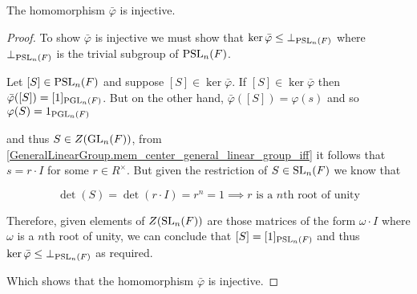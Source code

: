 \begin{lemma}
\label{Injective_PSL_monoidHom_PGL}
\leanok
    The homomorphism $\bar{\varphi}$ is injective.
\end{lemma}
\begin{proof}
\leanok

To show $\bar{\varphi}$ is injective we must show that $\ker \bar{\varphi} \leq \bot_{\operatorname{PSL}_n(F)}$ where $\bot_{\operatorname{PSL}_n(F)}$ is the trivial subgroup of $\operatorname{PSL}_n(F)$.

Let $[S] \in \operatorname{PSL}_n(F)$ and suppose $[S] \in \ker \bar{\varphi}$. If $[S] \in \ker \bar{\varphi}$ then $\bar{\varphi} ([S]) = [1]_{\operatorname{PGL}_n(F)}$. But on the other hand, $\bar{\varphi} ([S]) = \varphi(s)$ and so $\varphi(S) = 1_{\operatorname{PGL}_n(F)}$

and thus $S \in Z(\operatorname{GL}_n(F))$, from \ref{GeneralLinearGroup.mem_center_general_linear_group_iff} it follows that $s = r \cdot I$ for some $r \in R^\times$. But given the restriction of $S \in \operatorname{SL}_n(F)$ we know that 

\begin{equation*}
    \det(S) = \det(r \cdot I) = r^n = 1 \implies \text{$r$ is a $n$th root of unity}
\end{equation*}

Therefore, given elements of $Z(\operatorname{SL}_n(F))$ are those matrices of the form $\omega \cdot I$ where $\omega$ is a $n$th root of unity, we can conclude that $[S] = [1]_{\operatorname{PSL}_n(F)}$ and thus $\ker \bar{\varphi} \leq \bot_{\operatorname{PSL}_n(F)}$ as required.

Which shows that the homomorphism $\bar{\varphi}$ is injective.
\end{proof}
